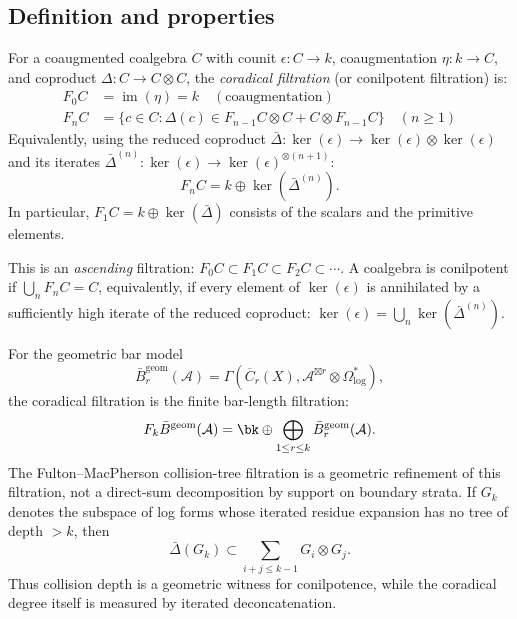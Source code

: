 \subsection{Definition and properties}

\begin{definition}\label{def:conilpotent-filtration}
For a coaugmented coalgebra $C$ with counit $\epsilon: C \to k$, coaugmentation $\eta: k \to C$, and coproduct $\Delta: C \to C \otimes C$, the \emph{coradical filtration} (or conilpotent filtration) is:
\begin{align*}
F_0C &= \operatorname{im}(\eta) = k \quad (\text{coaugmentation}) \\
F_nC &= \{c \in C : \Delta(c) \in F_{n-1}C \otimes C + C \otimes F_{n-1}C\} \quad (n \geq 1)
\end{align*}
Equivalently, using the reduced coproduct $\bar{\Delta}: \ker(\epsilon) \to \ker(\epsilon) \otimes \ker(\epsilon)$ and its iterates $\bar{\Delta}^{(n)}: \ker(\epsilon) \to \ker(\epsilon)^{\otimes(n+1)}$:
\[
F_nC = k \oplus \ker(\bar{\Delta}^{(n)}).
\]
In particular, $F_1C = k \oplus \ker(\bar{\Delta})$ consists of the scalars and the primitive elements.

This is an \emph{ascending} filtration: $F_0C \subset F_1C \subset F_2C \subset \cdots$.
A coalgebra is conilpotent if $\bigcup_n F_nC = C$, equivalently, if every element of $\ker(\epsilon)$ is annihilated by a sufficiently high iterate of the reduced coproduct: $\ker(\epsilon) = \bigcup_n \ker(\bar{\Delta}^{(n)})$.
\end{definition}

\begin{proposition}\label{prop:geom-conilpotent}
For the geometric bar model
\[
\bar B^{\mathrm{geom}}_r(\mathcal A)
=
\Gamma(\overline C_r(X),
\mathcal A^{\boxtimes r}\otimes\Omega^*_{\log}),
\]
the coradical filtration is the finite bar-length filtration:
\[
F_k\bar B^{\mathrm{geom}}(\mathcal A)
=
\bk\oplus\bigoplus_{1\le r\le k}
\bar B^{\mathrm{geom}}_r(\mathcal A).
\]
The Fulton--MacPherson collision-tree filtration is a geometric
refinement of this filtration, not a direct-sum decomposition by
support on boundary strata.  If $G_k$ denotes the subspace of log
forms whose iterated residue expansion has no tree of depth $>k$,
then
\[
\bar\Delta(G_k)\subset
\sum_{i+j\le k-1}G_i\otimes G_j.
\]
Thus collision depth is a geometric witness for conilpotence, while
the coradical degree itself is measured by iterated deconcatenation.
\end{proposition}

